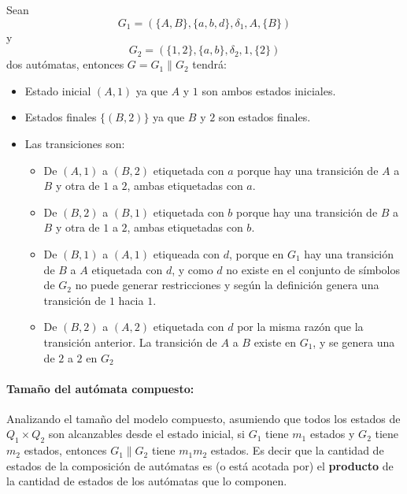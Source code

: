 Sean $$G_{1} = (\{A, B\}, \{a, b, d\}, \delta_{1}, A, \{B\})$$ y $$G_{2} = (\{1,
2\}, \{a, b\}, \delta_{2}, 1, \{2\})$$ dos autómatas, entonces $G = G_{1}
\parallel G_{2}$ tendrá:
\begin{itemize}
  \item Estado inicial $(A, 1)$ ya que $A$ y $1$ son ambos estados iniciales.
  \item Estados finales $\{(B, 2)\}$ ya que $B$ y $2$ son estados finales.
  \item Las transiciones son:
  \begin{itemize}
    \item De $(A,1)$ a $(B,2)$ etiquetada con $a$ porque hay una transición de
    $A$ a $B$ y otra de $1$ a $2$, ambas etiquetadas con $a$.
    \item De $(B,2)$ a $(B,1)$ etiquetada con $b$ porque hay una transición de
    $B$ a $B$ y otra de $1$ a $2$, ambas etiquetadas con $b$.
    \item De $(B,1)$ a $(A,1)$ etiqueada con $d$, porque en $G_{1}$ hay una
    transición de $B$ a $A$ etiquetada con $d$, y como $d$ no existe en el
    conjunto de símbolos de $G_{2}$ no puede generar restricciones y según la
    definición genera una transición de $1$ hacia $1$.
    \item De $(B,2)$ a $(A,2)$ etiquetada con $d$ por la misma razón que la
    transición anterior. La transición de $A$ a $B$ existe en $G_{1}$, y se
    genera una de $2$ a $2$ en $G_{2}$
  \end{itemize}
\end{itemize}
    
\paragraph{Tamaño del autómata compuesto:}
Analizando el tamaño del modelo compuesto, asumiendo que todos los estados de
$Q_{1} \times Q_{2}$ son alcanzables desde el estado inicial, si $G_{1}$ tiene
$m_{1}$ estados y $G_{2}$ tiene $m_{2}$ estados, entonces $G_{1} \parallel
G_{2}$ tiene $m_{1} m_{2}$ estados. Es decir que la cantidad de estados de la
composición de autómatas es (o está acotada por) el \textbf{producto} de la
cantidad de estados de los autómatas que lo componen.

